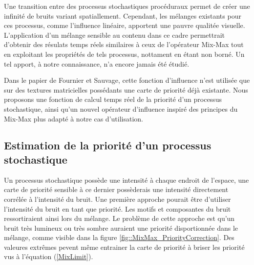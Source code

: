 \documentclass[9pt, twocolumn]{article} %
\begin{document}
Une transition entre des processus stochastiques procéduraux permet de créer
une infinité de bruits variant spatiallement. Cependant, les mélanges existants
pour ces processus, comme l'influence linéaire, apportent une pauvre qualitée
visuelle. L'application d'un mélange sensible au contenu dans ce cadre
permettrait d'obtenir des résulats temps réels similaires à ceux de l'opérateur
Mix-Max tout en exploitant les propriétés de tels processus, nottament en étant
non borné. Un tel apport, à notre connaissance, n'a encore jamais été étudié.

Dans le papier de Fournier et Sauvage, cette fonction d'influence n'est
utilisée que sur des textures matricielles possédants une carte de priorité
déjà existante. Nous proposons une fonction de calcul temps réel de la priorité
d'un processus stochastique, ainsi qu'un nouvel opérateur d'influence inspiré
des principes du Mix-Max plus adapté à notre cas d'utilisation.

\subsection{Estimation de la priorité d'un processus stochastique}

Un processus stochastique possède une intensité à chaque endroit de l'espace,
une carte de priorité sensible à ce dernier possèderais une intensité
directement corrélée à l'intensité du bruit. Une première approche pourait être
d'utiliser l'intensité du bruit en tant que priorité. Les motifs et composantes
du bruit ressortiraient ainsi lors du mélange. Le problème de cette approche
est qu'un bruit très lumineux ou très sombre auraient une priorité
disportionnée dans le mélange, comme visible dans la figure
\ref{fig::MixMax_PriorityCorrection}. Des valeures extrêmes pevent même
entrainer la carte de priorité à briser les priorité vus à l'équation
(\ref{MixLimit}).
\end{document}
